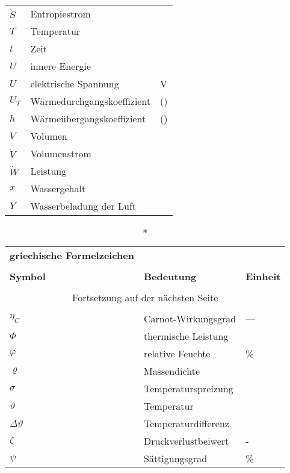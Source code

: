 \begin{onehalfspacing}
\begin{longtable}[h]{p{} p{} p{}}
		$\dot{S}$ & Entropiestrom & \watt\per\kelvin\\
		$T$ & Temperatur & \kelvin\\
		$t$ & Zeit & \second\\
		$U$ & innere Energie & \joule\\
		$U$ & elektrische Spannung & V \\
		$U_{T}$ & Wärmedurchgangskoeffizient & \watt\per(\kilogram\usk\kelvin)\\
		$h$ & Wärmeübergangskoeffizient & \watt\per(\squaremetre\usk\kelvin)\\		
		$V$ & Volumen & \cubic\meter\\
		$\dot{V}$&Volumenstrom&\cubic\meter\per\second\\
		$\dot{W}$ & Leistung & \watt\\
		$x$	& Wassergehalt & \kilogram \per \kilogram \\
		$Y$ & Wasserbeladung der Luft & \gram\per\kilogram\\
		
\end{longtable}

\begin{longtable}[h]{p{} p{} p{}}
		\caption*{\textbf{griechische Formelzeichen}} \\
		\\
		\textbf{Symbol} & \textbf{Bedeutung} & \textbf{Einheit} \\ %
		\endhead
		\\
		\multicolumn{3}{c}{Fortsetzung auf der nächsten Seite} \\
		\endfoot
		\multicolumn{3}{c}{ } \\
		\endlastfoot
		
		$\eta_{C}$ & Carnot-Wirkungsgrad & ---\\
		$\Phi$ & thermische Leistung & \watt\\
		$\varphi$ & relative Feuchte & \% \\
		$\varrho$& Massendichte&\kilogrampercubicmetre\\
		$\sigma$&Temperaturspreizung&\kelvin\\
		$\vartheta $ & Temperatur  & \degreecelsius\\
		$\Delta\vartheta $ & Temperaturdifferenz  &\kelvin\\
		$\zeta$ & Druckverlustbeiwert & -\\
		$\psi$ & Sättigungsgrad & \% \\
\end{longtable}


\end{onehalfspacing}
